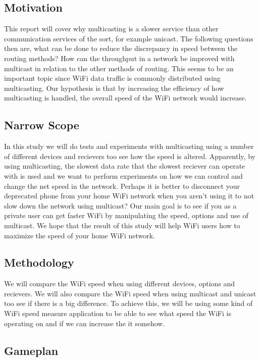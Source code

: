\documentclass[9pt,a4paper]{acmproc}
\begin{document}
\subsection{Motivation}

This report will cover why multicasting is a slower service than other communication services of the sort, for example unicast. The following questions then are, what can be done to reduce the discrepancy in speed between the routing methods? How can the throughput in a network be improved with multicast in relation to the other methods of routing. This seems to be an important topic since WiFi data traffic is commonly distributed using multicasting. Our hypothesis is that by increasing the efficiency of how multicasting is handled, the overall speed of the WiFi network would increase.

\subsection{Narrow Scope}

In this study we will do tests and experiments with multicasting using a number of different devices and recievers too see how the speed is altered. Apparently, by using multicasting, the slowest data rate that the slowest reciever can operate with is used and we want to perform experiments on how we can control and change the net speed in the network. Perhaps it is better to disconnect your deprecated phone from your home WiFi network when you aren't using it to not slow down the network using multicast? Our main goal is to see if you as a private user can get faster WiFi by manipulating the speed, options and use of multicast. We hope that the result of this study will help WiFi users how to maximize the speed of your home WiFi network.

\subsection{Methodology}

We will compare the WiFi speed when using different devices, options and recievers. We will also compare the WiFi speed when using multicast and unicast too see if there is a big difference. To achieve this, we will be using some kind of WiFi speed measure application to be able to see what speed the WiFi is operating on and if we can increase the it somehow. 

\subsection{Gameplan}
\end{document}
